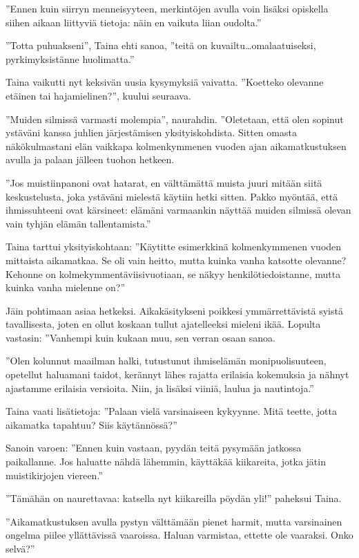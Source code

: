 ﻿\documentclass[a4paper, 12pt, finnish]{article}
\newcommand{\q}[1]{''#1''}
\newcommand{\openq}[1]{''#1} %
\begin{document}
\q{Ennen kuin siirryn menneisyyteen, merkintöjen avulla voin lisäksi opiskella
siihen aikaan liittyviä tietoja: näin en vaikuta liian oudolta.}

\q{Totta puhuakseni}, Taina ehti sanoa, \q{teitä on
kuvailtu\dots\allowbreak omalaatuiseksi, pyrkimyksistänne huolimatta.}

Taina vaikutti nyt keksivän uusia kysymyksiä vaivatta.
\q{Koetteko olevanne etäinen tai hajamielinen?}, kuului seuraava.

\q{Muiden silmissä varmasti molempia}, naurahdin. \openq{Oletetaan, että
olen sopinut ystäväni kanssa juhlien järjestämisen yksityiskohdista.
Sitten omasta näkökulmastani elän vaikkapa kolmenkymmenen vuoden
ajan aikamatkustuksen avulla ja palaan jälleen tuohon hetkeen.}

\q{Jos muistiinpanoni ovat hatarat, en välttämättä muista juuri
mitään siitä keskustelusta, joka ystäväni mielestä
käytiin hetki sitten. Pakko myöntää, että ihmissuhteeni ovat
kärsineet: elämäni varmaankin näyttää muiden silmissä olevan
vain tyhjän elämän tallentamista.}

Taina tarttui yksityiskohtaan: \q{Käytitte esimerkkinä kolmenkymmenen
vuoden mittaista aikamatkaa. Se oli vain heitto, mutta kuinka
vanha katsotte olevanne? Kehonne on kolmekymmentäviisivuotiaan,
se näkyy henkilötiedoistanne, mutta kuinka vanha mielenne on?}

Jäin pohtimaan asiaa hetkeksi. Aikakäsitykseni poikkesi
ymmärrettävistä syistä tavallisesta, joten en ollut koskaan
tullut ajatelleeksi mieleni ikää. Lopulta vastasin:
\openq{Vanhempi kuin kukaan muu, sen verran osaan sanoa.}

\q{Olen kolunnut maailman halki,
tutustunut ihmiselämän monipuolisuuteen, opetellut haluamani
taidot, kerännyt lähes rajatta erilaisia kokemuksia
ja nähnyt ajastamme erilaisia versioita. Niin, ja lisäksi
viiniä, laulua ja nautintoja.}

Taina vaati lisätietoja: \q{Palaan vielä varsinaiseen kykyynne.
Mitä teette, jotta aikamatka tapahtuu? Siis käytännössä?}

Sanoin varoen: \q{Ennen kuin vastaan, pyydän teitä
pysymään jatkossa paikallanne. Jos haluatte nähdä lähemmin,
käyttäkää kiikareita, jotka jätin muistikirjojen viereen.}

\q{Tämähän on naurettavaa: katsella nyt kiikareilla pöydän yli!} paheksui Taina.

\q{Aikamatkustuksen avulla pystyn välttämään pienet harmit,
mutta varsinainen ongelma piilee yllättävissä vaaroissa. Haluan
varmistaa, ettette ole vaaraksi. Onko selvä?}
 
\end{document}
